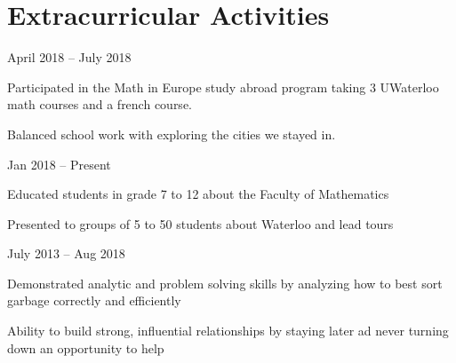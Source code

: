 \documentclass[]{formatting}
\begin{document}

\section{Extracurricular  Activities}

 {April 2018 – July 2018}
\begin{tightemize}
\item Participated in the Math in Europe study abroad program taking 3 UWaterloo math courses and a french course. 
\item Balanced school work with exploring the cities we stayed in. 
\end{tightemize}
\sectionsep

 {Jan 2018 – Present}
\begin{tightemize}
\item Educated students in grade 7 to 12 about the Faculty of Mathematics 
\item Presented to groups of 5 to 50 students about Waterloo and lead tours
\end{tightemize}
\sectionsep

 {July 2013 – Aug 2018}
\begin{tightemize}
\item Demonstrated analytic and problem solving skills by analyzing how to best sort garbage correctly and efficiently 
\item  Ability to build strong, influential relationships by staying later ad never turning down an opportunity to help
\end{tightemize}
\sectionsep
 
\end{document}
